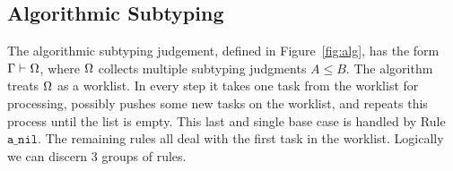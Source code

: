 \subsection{Algorithmic Subtyping}

The algorithmic subtyping judgement, defined in Figure~\ref{fig:alg}, has the form $\Gamma\vdash\Omega$, where
$\Omega$ collects multiple subtyping judgments $A\le B$. 
The algorithm treats $\Omega$ as a worklist. In every step
it takes one task from the worklist for processing, possibly
pushes some new tasks on the worklist, and repeats this
process until the list is empty. This last and single base case
is handled by Rule~$\mathtt{a\_nil}$.
The remaining rules all deal with the first task in the worklist.
Logically we can discern 3 groups of rules.


